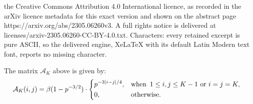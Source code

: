 \documentclass[10pt,a4paper]{amsart}
\newcommand{\A}{\mathcal{A}}
\newcommand{\bt}{\beta}
\begin{document}
the Creative Commons Attribution 4.0 International licence, as recorded in the arXiv licence metadata for this exact version and shown on the abstract page https://arxiv.org/abs/2305.06260v3. A full rights notice is delivered at licenses/arxiv-2305.06260-CC-BY-4.0.txt. Characters: every retained excerpt is pure ASCII, so the delivered engine, XeLaTeX with its default Latin Modern text font, reports no missing character.
\begin{proposition}
\label{proposition A}
The matrix $\A_K$ above is given by:
$$
\A_K(i,j) = \bt(1 - p^{-3/2}) \cdot \begin{dcases} p^{-3|i-j|/4}, & \text{when } \, {1 \leq i, j \leq K-1} \text{ or } i=j=K, \\ 0, & \text{otherwise}. \end{dcases}
$$
\end{proposition}
\end{document}
